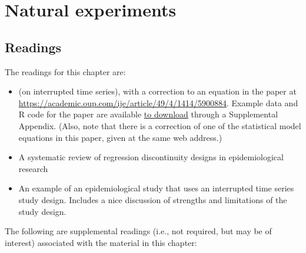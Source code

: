 \documentclass[
]{book}
\providecommand{\tightlist}{%
  \setlength{\itemsep}{0pt}\setlength{\parskip}{0pt}}
\begin{document}
\chapter{Natural experiments}\label{natural-experiments}

\section{Readings}\label{readings-2}

The readings for this chapter are:

\begin{itemize}
\tightlist
\item
  \citet{bernal2017interrupted} (on interrupted time series), with a correction to an equation in the paper at \url{https://academic.oup.com/ije/article/49/4/1414/5900884}. Example data and R code for the paper are available \href{https://oup.silverchair-cdn.com/oup/backfile/Content_public/Journal/ije/49/4/10.1093_ije_dyaa118/1/dyaa118_supplementary_data.zip?Expires=1623897009&Signature=BzYQrBg60cMKHYeDU~OIZYIFuRgEIPwQsWMjzON0dB~fL8y-8x4xdGIJQBBPgDxBIoUIGnjmShVf1jlVqzloo3IldAdVC78TZ~~XseYdJ9c590QRAR6m7mH~VbPe-fCnQSnZF0z2Qw9PZcSGITZeNr4YXPVY-~gtpgBeZiN0MpgEVBLVT5fYhhQBGbp0vxl1bKdUfNtF71fdVJrglkhSG8-M24A07LmAr8jThx4MQmSAzKCxA4VZLRE6To8zC3-rJlxyWiqrSTFsVQM2SN4R6UuxYoRsILRcIAr2sUfqgmaSlxBiYAf71PdGSrnBcXX3l0l7yuAftX5PYTwMKTyxOA__&Key-Pair-Id=APKAIE5G5CRDK6RD3PGA}{to download} through a Supplemental Appendix. (Also, note that there is a correction of one of the statistical model equations in this paper, given at the same web address.)
\item
  \citet{bor2014regression} A systematic review of regression discontinuity designs in epidemiological research
\item
  \citet{lopez2013effect} An example of an epidemiological study that uses an interrupted time series study design. Includes a nice discussion of strengths and limitations of the study design.
\end{itemize}

The following are supplemental readings (i.e., not required, but may be of
interest) associated with the material in this chapter:
\end{document}
